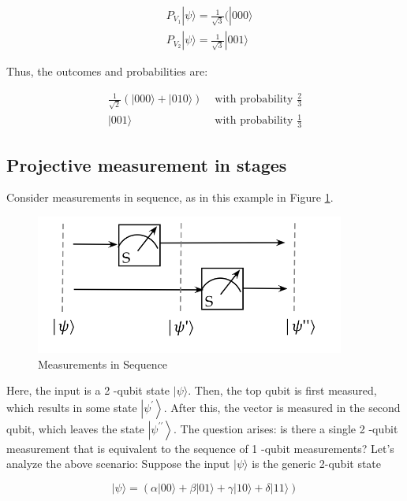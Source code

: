 \documentclass[main.tex]{subfiles}
\begin{document}
    $$
    \begin{aligned}
    &P_{V_{1}}|\psi\rangle=\frac{1}{\sqrt{3}}(|000\rangle \\
    &P_{V_{2}}|\psi\rangle=\frac{1}{\sqrt{3}}|001\rangle
    \end{aligned}
    $$
    
    Thus, the outcomes and probabilities are:
    
    $$
    \begin{array}{rr}
    \frac{1}{\sqrt{2}}(|000\rangle+|010\rangle) & \text { with probability } \frac{2}{3} \\
    |001\rangle & \text { with probability } \frac{1}{3}
    \end{array}
    $$

\subsection{Projective measurement in stages}

    Consider measurements in sequence, as in this example in Figure \ref{fig:09measure8}.
    
    \begin{figure}
        \centering
        \includegraphics[width=4in]{notes/figs/n07/09measure8.png}
        \caption{Measurements in Sequence}
        \label{fig:09measure8}
    \end{figure}
    
    Here, the input is a 2 -qubit state $|\psi\rangle$. Then, the top qubit is first measured, which results in some state $\left|\psi^{\prime}\right\rangle$. After this, the vector is measured in the second qubit, which leaves the state $\left|\psi^{\prime \prime}\right\rangle$. The question arises: is there a single 2 -qubit measurement that is equivalent to the sequence of 1 -qubit measurements? Let's analyze the above scenario: Suppose the input $|\psi\rangle$ is the generic 2-qubit state
    
    $$
    |\psi\rangle=(\alpha|00\rangle+\beta|01\rangle+\gamma|10\rangle+\delta|11\rangle)
    $$
    
\end{document}
